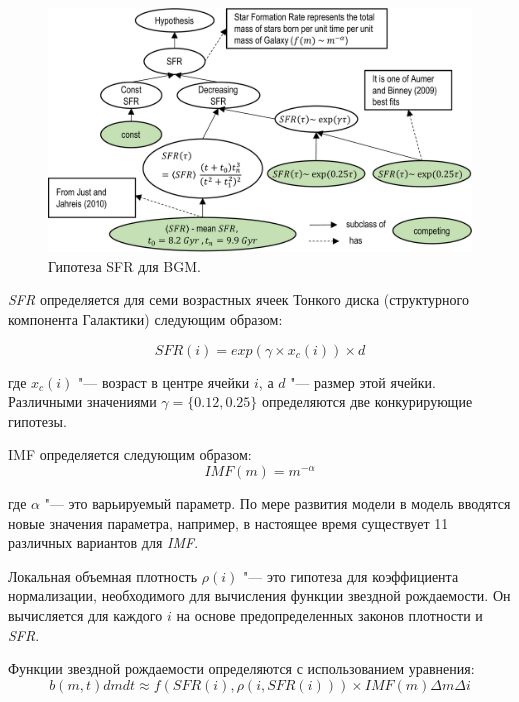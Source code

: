 \begin{figure}[ht]
    \centering
    \includegraphics[width=1.0\linewidth]{images/SFR.pdf}
    \caption{Гипотеза SFR для BGM.}\label{fig:SFR}
\end{figure}

\textit{SFR} определяется для семи возрастных ячеек Тонкого диска (структурного компонента Галактики) следующим образом:

\begin{equation}
    SFR(i) = exp(\gamma \times x_c(i)) \times d
\end{equation}

где $x_c(i)$ "--- возраст в центре ячейки $i$, а $d$ "--- размер этой ячейки. Различными значениями 
$\gamma = \{0.12, 0.25\}$ определяются две конкурирующие гипотезы.

IMF определяется следующим образом:
\begin{equation}
    IMF(m) = m^{-\alpha}
\end{equation}

где $\alpha$ "--- это варьируемый параметр. По мере развития модели в модель вводятся новые значения параметра, 
например, в настоящее время существует 11 различных вариантов для \textit{IMF}.

Локальная объемная плотность $\rho(i)$ "--- это гипотеза для коэффициента нормализации, необходимого для вычисления 
функции звездной рождаемости. Он вычисляется для каждого $i$ на основе предопределенных 
законов плотности и \textit{SFR}.

Функции звездной рождаемости определяются с использованием уравнения:
\begin{equation}
b(m, t)dm dt \approx f\left(SFR\left(i\right), \rho\left(i, SFR\left(i\right)\right)\right) 
\times IMF(m)\Delta m \Delta i
\end{equation}

